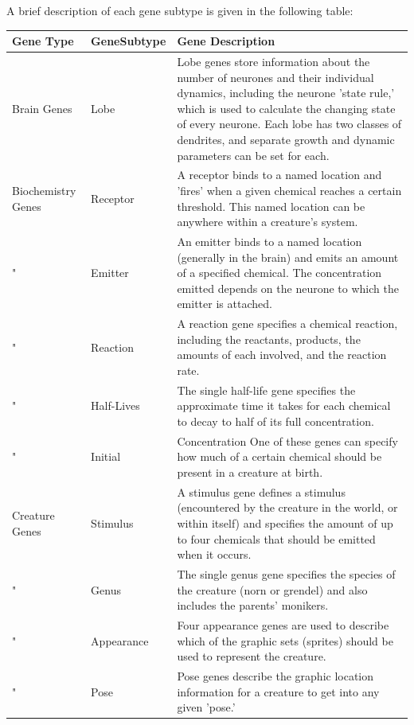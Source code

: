 \documentclass[11pt,twoside,a4paper]{article}
\begin{document}
A brief description of each gene subtype is given in the following table: ~\\
\begin{tabular}[c]{|p{2.00cm}|p{2.00cm}|p{14.00cm}|}
	\hline
	\rowcolor{gray}
	\textbf{Gene Type}	&	\textbf{Gene\newline Subtype}	&	\textbf{Gene Description}	\\ \hline
	Brain Genes			&	Lobe							&	Lobe genes store information about the number of neurones and their individual dynamics, including the neurone 'state rule,' which is used to calculate the changing state of every neurone. Each lobe has two classes of dendrites, and separate growth and dynamic parameters can be set for each. \\ \hline
	Biochemistry Genes	&	Receptor						&	A receptor binds to a named location and 'fires' when a given chemical reaches a certain threshold. This named location can be anywhere within a creature's system. \\ \hline
	"					&	Emitter							&	An emitter binds to a named location (generally in the brain) and emits an amount of a specified chemical. The concentration emitted depends on the neurone to which the emitter is attached. \\ \hline
	"					&	Reaction						&	A reaction gene specifies a chemical reaction, including the reactants, products, the amounts of each involved, and the reaction rate. \\ \hline
	"					&	Half-Lives						&	The single half-life gene specifies the approximate time it takes for each chemical to decay to half of its full concentration. \\ \hline
	"					&	Initial							&	Concentration	One of these genes can specify how much of a certain chemical should be present in a creature at birth. \\ \hline
	Creature Genes		&	Stimulus						&	A stimulus gene defines a stimulus (encountered by the creature in the world, or within itself) and specifies the amount of up to four chemicals that should be emitted when it occurs. \\ \hline
	"					&	Genus							&	The single genus gene specifies the species of the creature (norn or grendel) and also includes the parents' monikers. \\ \hline
	"					&	Appearance						&	Four appearance genes are used to describe which of the graphic sets (sprites) should be used to represent the creature. \\ \hline
	"					&	Pose							&	Pose genes describe the graphic location information for a creature to get into any given 'pose.' \\ \hline

\end{tabular}
\end{document}
